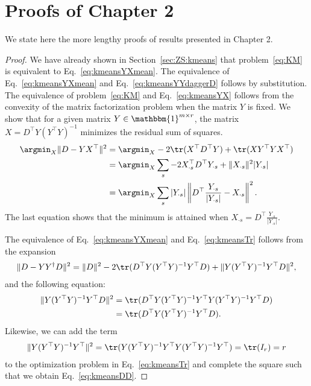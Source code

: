 \chapter{Proofs of Chapter 2}\label{chap:AppendixZS}
We state here the more lengthy proofs of results presented in Chapter 2.
\kmeansobj*
\begin{proof}
We have already shown in Section~\ref{sec:ZS:kmeans} that problem~\eqref{eq:KM} is equivalent to Eq.~\eqref{eq:kmeansYXmean}. The equivalence of Eq.~\eqref{eq:kmeansYXmean} and Eq.~\eqref{eq:kmeansYYdaggerD} follows by substitution.
The equivalence of problem~\eqref{eq:KM} and Eq.~\eqref{eq:kmeansYX} follows from the convexity of the matrix factorization problem when the matrix $Y$ is fixed. We show that for a given matrix $Y\in\mathbbm{1}^{m\times r}$, the matrix $X=D^\top Y(Y^\top Y)^{-1}$
minimizes the residual sum of squares.
\begin{align}
\argmin_X \|D-YX^\top\|^2 &= \argmin_X -2\tr(X^\top D^\top Y) + \tr(XY^\top Y X^\top)\nonumber\\
&= \argmin_X\sum_s -2X_{\cdot s}^\top D^\top Y_{\cdot s} +\|X_{\cdot s}\|^2|Y_{\cdot s}|\nonumber\\
	&= \argmin_X\sum_s |Y_{\cdot s}|\left\|D^\top \frac{Y_{\cdot s}}{|Y_{\cdot s}|}-X_{\cdot s}\right\|^2. \label{eq:proofKMeansX}
\end{align}
The last equation shows that the minimum is attained when $X_{\cdot s}=D^\top \frac{Y_{\cdot s}}{|Y_{\cdot s}|}$. 

The equivalence of Eq.~\eqref{eq:kmeansYXmean} and Eq.~\eqref{eq:kmeansTr} follows from the expansion 
\begin{align*}
\|D-YY^\dagger D\|^2 =  \|D\|^2 -2\tr(D^\top Y(Y^\top Y)^{-1}Y^\top D) +\|Y (Y^\top Y)^{-1}Y^\top D\|^2,
\end{align*}
and the following equation:
\begin{align*}
\|Y (Y^\top Y)^{-1}Y^\top D\|^2&= \tr(D^\top Y(Y^\top Y)^{-1}Y^\top Y (Y^\top Y)^{-1}Y^\top D)\\
&=\tr(D^\top Y(Y^\top Y)^{-1}Y^\top D).
\end{align*}
Likewise, we can add the term 
\begin{align*}
\|Y(Y^\top Y)^{-1}Y^\top\|^2 = \tr(Y(Y^\top Y)^{-1}Y^\top Y(Y^\top Y)^{-1}Y^\top) = \tr(I_r)=r 
\end{align*}
to the optimization problem in Eq.~\eqref{eq:kmeansTr} and complete the square such that we obtain Eq.~\eqref{eq:kmeansDD}.
\end{proof}

